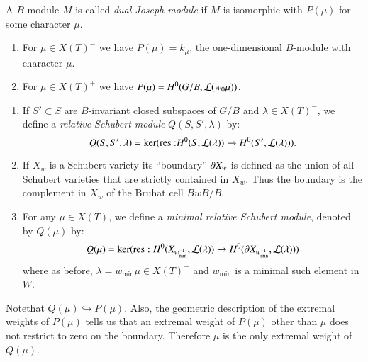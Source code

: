 \begin{definition}\label{chap2-defi2.3.2}
A $B$-module $M$ is called 
{\em dual Joseph module} if $M$ is 
isomorphic with $P(\mu)$ for some character $\mu$.
\end{definition}

\begin{example}\label{chap2-exam2.3.3}
\begin{enumerate}
\item For $\mu\in X(T)^{-}$ we have $P(\mu)=k_{\mu}$, the
  one-dimensional $B$-module with character $\mu$.

\item For $\mu\in X(T)^{+}$ we have $P(\mu)=H^{0}(G/B,\mathcal{L}(w_{0}\mu))$.
\end{enumerate}
\end{example}

\begin{definition}\label{chap2-defi2.3.4}
\begin{enumerate}
\renewcommand{\theenumi}{\roman{enumi}}
\renewcommand{\labelenumi}{(\theenumi)}
\item If $S'\subset S$ are $B$-invariant closed subspaces of $G/B$ and
  $\lambda\in X(T)^{-}$, we define a {\em relative Schubert
  module}\break 
  $Q(S,S',\lambda)$ by:
  $$
Q(S,S',\lambda)=\ker(\text{res~:}H^{0}(S,\mathcal{L}(\lambda))\to
  H^{0}(S',\mathcal{L}(\lambda))). 
$$

\item If $X_{w}$ is a Schubert variety its 
``boundary'' $\partial X_{w}$ is
  defined as the union of all Schubert varieties that are strictly
  contained in $X_{w}$. Thus the boundary is the complement in $X_{w}$
  of the Bruhat cell $BwB/B$.

\item For any $\mu\in X(T)$, we define a {\em minimal relative
  Schubert module}, denoted by $Q(\mu)$ by:
$$
Q(\mu)=\ker(\operatorname{res}:H^{0}(X_{w^{-1}_{\min}},\mathcal{L}(\lambda))\to H^{0}(\partial
X_{w^{-1}_{\min}},\mathcal{L}(\lambda))) 
$$
where as before, $\lambda=w_{\min}\mu\in X(T)^{-}$ and $w_{\min}$ is a
minimal such element in $W$. 
\end{enumerate}
\end{definition}

\begin{remark}\label{chap2-rem2.3.5}
Note\pageoriginale that\label{page20} $Q(\mu)\hookrightarrow P(\mu)$. Also, the
geometric description of the extremal weights of $P(\mu)$ tells us
that an extremal weight of $P(\mu)$ other than $\mu$ does not restrict
to zero on the boundary. Therefore $\mu$ is the only extremal weight
of $Q(\mu)$.
\end{remark}

